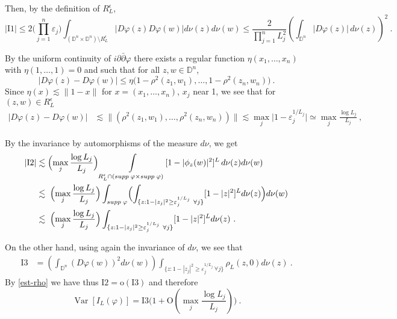 \documentclass[12pt,twoside,final,amsfonts]{amsart}
\theoremstyle{plain}
\theoremstyle{definition}
\theoremstyle{definition}
\begin{document}
Then, by the definition of $R_L^\epsilon$,
\[
 |\textrm{I1}|\leq 2 \bigl(\prod_{j=1}^n \varepsilon_{j}\bigr) \int_{({\mathbb{D}}^n\times {\mathbb{D}}^n)\setminus R_L^\epsilon} |D\varphi(z) D\varphi(w)| d\nu(z) d\nu(w)
 \leq  \frac 2{\prod_{j=1}^n L_j^2} \left(\int_{{\mathbb{D}}^n} |D\varphi(z)|\, d\nu(z)\right)^2\ .
\]

By the uniform continuity of $i\partial\bar\partial\varphi$ there exists a regular function $\eta(x_1,\dots,x_n)$ with $ \eta(1,\dots,1)=0$ and such that for all $z,w\in{\mathbb{D}}^n$,
\[
 |D\varphi(z)-D\varphi(w)|\leq \eta\bigl(1-\rho^2(z_1, w_1),\dots, 1-\rho^2(z_n, w_n)\bigr)\ .
\]
Since $\eta(x)\lesssim \|1-x\|$ for $x=(x_1,\dots, x_n)$, $x_j$ near 1, we see that for $(z,w)\in R_L^\epsilon$
\begin{align*}
|D\varphi(z)-D\varphi(w)|&\lesssim \|(\rho^2(z_1, w_1),\dots, \rho^2(z_n, w_n))\|
 \lesssim 
 \max_j\bigl|1-\varepsilon_j^{1/L_j}\bigr|\simeq\max_j \frac{\log L_j}{L_j}\ ,
\end{align*}

By the invariance by automorphisms of the measure $d\nu$, we get
\begin{align*}
 |\textrm{I2}|&\lesssim \Bigl( \max_j \frac{\log L_j}{L_j}\Bigr) \int\limits_{R_L^\epsilon\cap(supp\; \varphi\times supp\; \varphi)} [1-|\phi_z(w)|^2]^L\,  d\nu(z) d\nu(w)\\
&\lesssim \; \Bigl( \max_j \frac{\log L_j}{L_j}\Bigr)
\int_{supp\;\varphi}\Bigl(\int_{\{z: 1-|z_j|^2 \geq\varepsilon_{j}^{1/L_j}\ \forall j\}} [1-|z|^2]^L d\nu(z)\Bigr) d\nu(w)\\
&\lesssim \; \Bigl( \max_j \frac{\log L_j}{L_j}\Bigr) \int_{\{z: 1-|z_j|^2 \geq\varepsilon_{j}^{1/L_j}\ \forall j\}} [1-|z|^2]^L d\nu(z)\ .
\end{align*}

On the other hand, using again the invariance of $d\nu$, we see that
\begin{align*}
 \textrm{I3}&=
 
 \left(\int_{{\mathbb{D}}^n} (D\varphi(w))^2 d\nu(w)\right) \int_{\{z: 1-|z_j|^2 \geq\varepsilon_{j}^{1/L_j}\ \forall j\}} \rho_L(z,0) d\nu(z)\ .
\end{align*}
By \eqref{est-rho} we have thus $\textrm{I2}=\textrm{o}(\textrm{I3})$ and therefore
\begin{equation}\label{ls}
 {\operatorname{Var}}[I_L(\varphi)]=\textrm{I3} \bigl(1+\textrm{O}(\max_j \frac{\log L_j}{L_j})\bigr) \ .
\end{equation}
\end{document}
